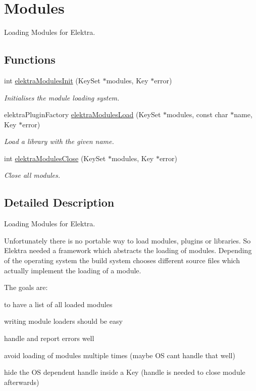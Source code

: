 \hypertarget{group__modules}{}\section{Modules}
\label{group__modules}


Loading Modules for Elektra.  


\subsection*{Functions}
\begin{DoxyCompactItemize}
\item 
int \hyperlink{group__modules_gaa40915e67f973ccd5258aa450bd03585}{elektra\+Modules\+Init} (Key\+Set $\ast$modules, Key $\ast$error)
\begin{DoxyCompactList}\small\item\em Initialises the module loading system. \end{DoxyCompactList}\item 
elektra\+Plugin\+Factory \hyperlink{group__modules_ga09300fbf0e0cfc9dc80bb877b00117c0}{elektra\+Modules\+Load} (Key\+Set $\ast$modules, const char $\ast$name, Key $\ast$error)
\begin{DoxyCompactList}\small\item\em Load a library with the given name. \end{DoxyCompactList}\item 
int \hyperlink{group__modules_ga5646d92ffe3e1e04c4586d9c910ba6bd}{elektra\+Modules\+Close} (Key\+Set $\ast$modules, Key $\ast$error)
\begin{DoxyCompactList}\small\item\em Close all modules. \end{DoxyCompactList}\end{DoxyCompactItemize}


\subsection{Detailed Description}
Loading Modules for Elektra. 

Unfortunately there is no portable way to load modules, plugins or libraries. So Elektra needed a framework which abstracts the loading of modules. Depending of the operating system the build system chooses different source files which actually implement the loading of a module.

The goals are\+:
\begin{DoxyItemize}
\item to have a list of all loaded modules
\item writing module loaders should be easy
\item handle and report errors well
\item avoid loading of modules multiple times (maybe OS can\textquotesingle{}t handle that well)
\item hide the OS dependent handle inside a Key (handle is needed to close module afterwards) 
\end{DoxyItemize}

